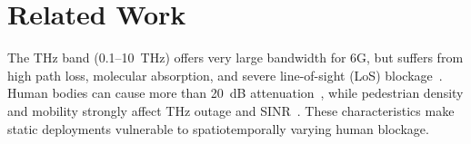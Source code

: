 \documentclass[conference]{IEEEtran}
\begin{document}





\section{Related Work}

The THz band (0.1--10~THz) offers very large bandwidth for 6G, but
suffers from high path loss, molecular absorption, and severe
line-of-sight (LoS) blockage~\cite{b5,b1,b2}. Human bodies can cause
more than 20~dB attenuation~\cite{b6}, while pedestrian density and
mobility strongly affect THz outage and SINR~\cite{b3,b14}. These
characteristics make static deployments vulnerable to
spatiotemporally varying human blockage.
\end{document}
